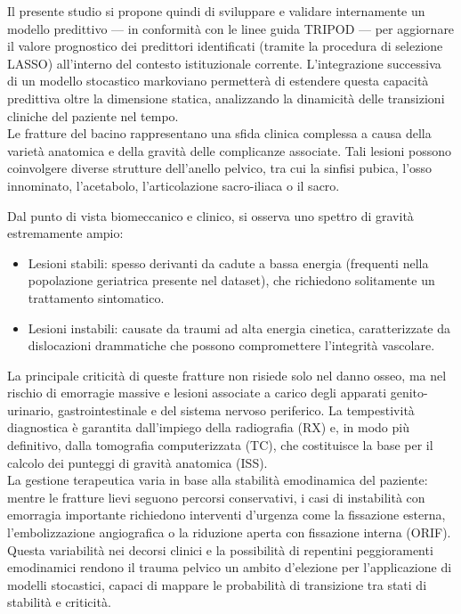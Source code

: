 \documentclass[11pt, oneside, noexaminfo]{sapthesis}   	%
\begin{document}
Il presente studio si propone quindi di sviluppare e validare internamente un modello predittivo — in conformità con le linee guida TRIPOD \cite{collins2015tripod} — per aggiornare il valore prognostico dei predittori identificati (tramite la procedura di selezione LASSO) all'interno del contesto istituzionale corrente. L'integrazione successiva di un modello stocastico markoviano permetterà di estendere questa capacità predittiva oltre la dimensione statica, analizzando la dinamicità delle transizioni cliniche del paziente nel tempo.\\

Le fratture del bacino rappresentano una sfida clinica complessa a causa della varietà anatomica e della gravità delle complicanze associate. Tali lesioni possono coinvolgere diverse strutture dell'anello pelvico, tra cui la sinfisi pubica, l’osso innominato, l’acetabolo, l’articolazione sacro-iliaca o il sacro.

Dal punto di vista biomeccanico e clinico, si osserva uno spettro di gravità estremamente ampio:
\begin{itemize}
	\item Lesioni stabili: spesso derivanti da cadute a bassa energia (frequenti nella popolazione geriatrica presente nel dataset), che richiedono solitamente un trattamento sintomatico.

	\item Lesioni instabili: causate da traumi ad alta energia cinetica, caratterizzate da dislocazioni drammatiche che possono compromettere l'integrità vascolare.
\end{itemize}

La principale criticità di queste fratture non risiede solo nel danno osseo, ma nel rischio di emorragie massive e lesioni associate a carico degli apparati genito-urinario, gastrointestinale e del sistema nervoso periferico. La tempestività diagnostica è garantita dall'impiego della radiografia (RX) e, in modo più definitivo, dalla tomografia computerizzata (TC), che costituisce la base per il calcolo dei punteggi di gravità anatomica (ISS). \\

La gestione terapeutica varia in base alla stabilità emodinamica del paziente: mentre le fratture lievi seguono percorsi conservativi, i casi di instabilità con emorragia importante richiedono interventi d'urgenza come la fissazione esterna, l'embolizzazione angiografica o la riduzione aperta con fissazione interna (ORIF). Questa variabilità nei decorsi clinici e la possibilità di repentini peggioramenti emodinamici rendono il trauma pelvico un ambito d'elezione per l'applicazione di modelli stocastici, capaci di mappare le probabilità di transizione tra stati di stabilità e criticità. \\
\end{document}
